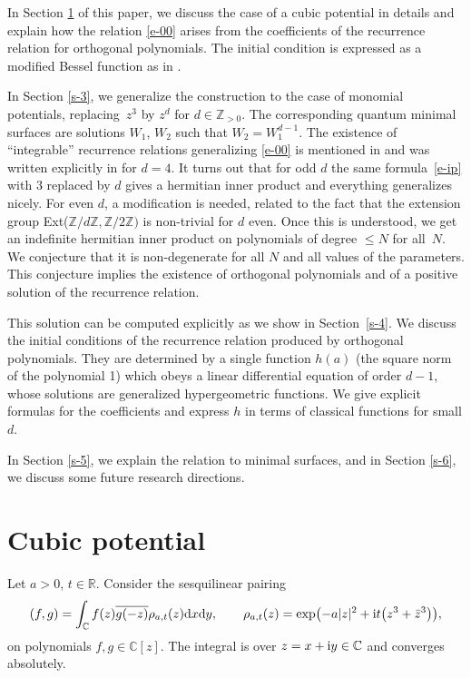 \documentclass[pdftex]{sigma}
\numberwithin{equation}{section}
\theoremstyle{definition}
\begin{document}
In Section \ref{s-2} of this paper, we discuss the case of a cubic potential in details and explain how the relation \eqref{e-00} arises from the coefficients of the recurrence relation for orthogonal polynomials. The initial condition is expressed as a modified Bessel function as in \cite{CDHM2025,Hoppe2025}.

In Section \ref{s-3}, we generalize the construction to the case of monomial potentials, replacing~$z^3$ by $z^d$ for $d\in\mathbb Z_{>0}$. The corresponding quantum minimal surfaces are solutions $W_1$, $W_2$ such that $W_2=W_1^{d-1}$. The existence of ``integrable'' recurrence relations generalizing \eqref{e-00} is mentioned in \cite{AHK2019} and was written explicitly in \cite{CDHM2025,Hoppe2025} for $d=4$. It turns out that for odd $d$ the same formula~\eqref{e-ip} with $3$ replaced by $d$ gives a hermitian inner product and everything generalizes nicely. For even $d$, a modification is needed, related to the fact that the extension group Ext($\mathbb Z/d\mathbb Z,\mathbb Z/2\mathbb Z)$ is non-trivial for $d$ even. Once this is understood, we get an indefinite hermitian inner product on polynomials of degree $\leq N$ for all~$N$. We conjecture that it is non-degenerate for all $N$ and all values of the parameters. This conjecture implies the existence of orthogonal polynomials and of a positive solution of the recurrence relation.

This solution can be computed explicitly as we show in Section~\ref{s-4}. We discuss the initial conditions of the recurrence relation produced by orthogonal polynomials. They are determined by a single function $h(a)$ (the square norm of the polynomial 1) which obeys a linear differential equation of order $d-1$, whose solutions are generalized hypergeometric functions. We give explicit formulas for the coefficients and express $h$ in terms of classical functions for small $d$.

In Section \ref{s-5}, we explain the relation to minimal surfaces, and in Section \ref{s-6}, we discuss some future research directions.

\section{Cubic potential}\label{s-2}
Let $a>0$, $t\in\mathbb R$. Consider the sesquilinear pairing
\begin{equation}\label{e-1}
(f,g)=\int_{\mathbb C}f(z)\overline{g(-z)}\rho_{a,t}(z){\rm d}x{\rm d}y,\qquad
\rho_{a,t}(z)=\exp\bigl(-a|z|^2+{\rm i}t\bigl(z^3+\bar z^3\bigr)\bigr),
\end{equation}
on polynomials $f,g\in\mathbb C[z]$. The integral is over $z=x+{\rm i}y\in\mathbb C$ and converges absolutely.
\end{document}
